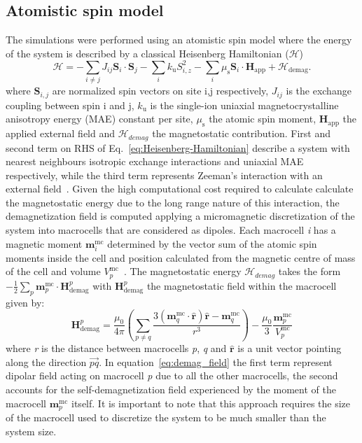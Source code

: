 \documentclass[aps,prb,signlecolumn,preprint,superscriptaddress,10]{revtex4-1}
\newcommand{\HH}{\ensuremath{\mathscr{H}}}
\newcommand{\smmu}{\ensuremath{\mu_{\mathrm{s}}}\xspace}
\newcommand{\smJij}{\ensuremath{J_{ij}}\xspace}
\newcommand{\smKu}{\ensuremath{k_{\mathrm{u}}}\xspace}
\newcommand{\sms}{\ensuremath{\mathbf{S}}\xspace}
\begin{document}
\subsection*{Atomistic spin model}
The simulations were performed using an atomistic spin model where the energy of the system is described by a classical Heisenberg Hamiltonian  (\HH)
\begin{equation}
\HH = -\sum_{i\ne j} \smJij \sms_i \cdot \sms_j -\sum_{i} \smKu S_{i,z}^2 - \sum_i \smmu \sms_i \cdot \mathrm{\mathbf{H}_{app}} + \HH_{\mathrm{demag}}.
\label{eq:Heisenberg-Hamiltonian}
\end{equation}
where $\sms_{i,j}$ are normalized spin vectors on site i,j respectively, \smJij is the exchange  coupling between spin i and j, \smKu is the single-ion uniaxial magnetocrystalline anisotropy energy (MAE) constant per site, \smmu the atomic spin moment,  $\mathrm{\mathbf{H}_{app}}$ the applied external field and $\HH_{demag}$ the magnetostatic contribution. First and second term on RHS  of Eq.~\ref{eq:Heisenberg-Hamiltonian} describe a system with nearest neighbours isotropic exchange interactions and uniaxial MAE respectively, while the third term represents Zeeman's interaction with an external field~\cite{vampire-rev}.  Given the high computational cost required to calculate calculate the magnetostatic energy due to the long range nature of this interaction, the demagnetization field is computed applying a micromagnetic discretization of the system into macrocells that are considered as dipoles. Each macrocell \textit{i} has a magnetic moment $\mathrm{\mathbf{m}}_i^{\mathrm{mc}}$ determined by the vector sum of the atomic spin moments inside the cell and position calculated from the magnetic centre of mass of the cell and volume $V_p^{\mathrm{mc}}$~\cite{vampire-rev}. The magnetostatic energy 
$\HH_{demag}$ takes the form $-\frac{1}{2}\sum_p \mathrm{\mathbf{m}}_p^{\mathrm{mc}} \cdot \mathrm{\mathbf{H}}^p_{\mathrm{demag}}$ with $\mathrm{\mathbf{H}}^p_{\mathrm{demag}}$ the magnetostatic field within the macrocell given by:
\begin{equation}
\mathrm{\mathbf{H}}^p_{\mathrm{demag}} = \frac{\mu_0}{4 \pi} 
\left(
\sum_{p\neq q}\frac{3 \left( \mathbf{m}_q^{\mathrm{mc}} \cdot \mathbf{\hat{r}}\right) \mathbf{\hat{r}} - \mathbf{m}_q^{\mathrm{mc}} }{r^3} 
\right) - \frac{\mu_0}{3}\frac{ \mathbf{m}_p^{\mathrm{mc}} }{ V_p^{\mathrm{mc}} }
\label{eq:demag_field}
\end{equation}
where \textit{r} is the distance between macrocells \textit{p}, \textit{q} and $\mathbf{\hat{r}}$ is a unit vector pointing along the direction $\overrightarrow{pq}$.  In equation~\ref{eq:demag_field} the first term represent dipolar field acting on macrocell \textit{p} due to all the other macrocells, the second accounts for the self-demagnetization field experienced by the moment of the macrocell $\mathrm{\mathbf{m}}_p^{\mathrm{mc}}$ itself. It is important to note that this approach requires the size of the macrocell used to discretize the system to be much smaller than the system size.
\end{document}
